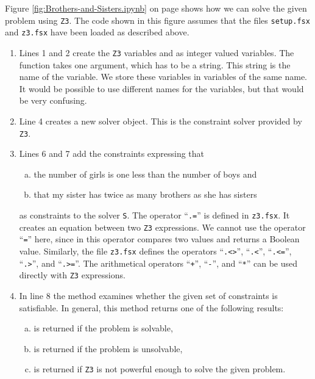 \noindent
Figure \ref{fig:Brothers-and-Sisters.ipynb} on page \pageref{fig:Brothers-and-Sisters.ipynb} shows how we can
solve the given problem using \texttt{Z3}.  The code shown in this figure assumes that the files
\texttt{setup.fsx} and \texttt{z3.fsx} have been loaded as described above.
\begin{enumerate}
\item Lines 1 and 2 create the \texttt{Z3} variables  and  as integer valued variables.
      The function  takes one argument, which has to be a string.  This string is the name of the
      variable.  We store these variables in \Fsharp{} variables of the same name.  It would be possible to use
      different names for the \Fsharp{} variables, but that would be very confusing.
\item Line 4 creates a new solver object.  This is the constraint solver provided by \texttt{Z3}.
\item Lines 6 and 7 add the constraints expressing that
      \begin{enumerate}[(a)]
      \item the number of girls is one less than the number of boys \quad and 
      \item that my sister has twice as many brothers as she has sisters 
      \end{enumerate}
      as constraints to the solver \texttt{S}.  The operator ``\texttt{.=}'' is defined in \texttt{z3.fsx}.  It
      creates an equation between two \texttt{Z3} expressions.  We cannot use the operator ``\texttt{=}'' here,
      since in \Fsharp{} this operator compares two values and returns a Boolean value.  Similarly, the
      file \texttt{z3.fsx} defines the operators ``\texttt{.<>}'', ``\texttt{.<}'', ``\texttt{.<=}'',
      ``\texttt{.>}'', and ``\texttt{.>=}''.  The arithmetical operators ``\texttt{+}'', ``\texttt{-}'', and
      ``\texttt{*}'' can be used directly with \texttt{Z3} expressions.
\item In line 8 the method  examines whether the given set of constraints is satisfiable.
      In general, this method returns one of the following results:
      \begin{enumerate}[(a)]
      \item {} is returned if the problem is solvable,
      \item {} is returned if the problem is unsolvable,
      \item {} is returned if \texttt{Z3} is not powerful enough to solve the given problem.

\end{enumerate}
\end{enumerate}
